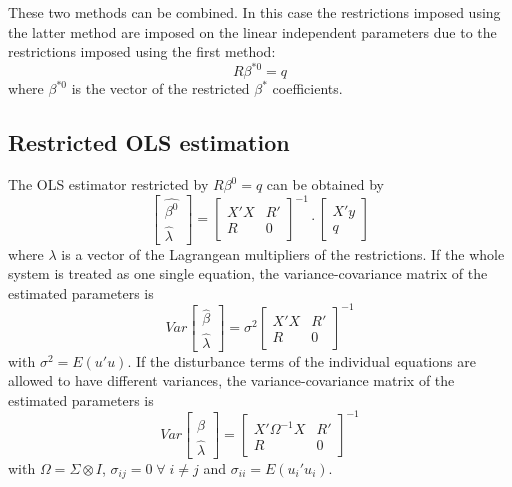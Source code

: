 These two methods can be combined.
In this case the restrictions imposed using the latter method are
imposed on the linear independent parameters due to the restrictions
imposed using the first method:
\begin{equation}
   R \beta^{*0} = q
\end{equation}
where $\beta^{*0}$ is the vector of the restricted $\beta^*$ coefficients.

\subsection{Restricted OLS estimation}
\label{sec:olsR}

The OLS estimator restricted by $R \beta^0 = q$ can be obtained by
\begin{equation}
   \left[ \begin{array}{c}
      \widehat{\beta^0} \\ \widehat{\lambda}
   \end{array} \right]
   =
   \left[ \begin{array}{cc}
      X' X & R' \\ 
      R & 0
   \end{array} \right]^{-1}
   \cdot
   \left[ \begin{array}{c}
      X' y \\ q 
   \end{array} \right]
\end{equation}
where $\lambda$ is a vector of the Lagrangean multipliers of the restrictions.
If the whole system is treated as one single equation,
the variance-covariance matrix of the estimated parameters is
\begin{equation}
   Var 
   \left[ \begin{array}{c}
      \widehat{\beta} \\ \widehat{\lambda}
   \end{array} \right] 
   = \sigma^2 
   \left[ \begin{array}{cc}
      X' X & R' \\ 
      R & 0
   \end{array} \right]^{-1}
\end{equation}
with $\sigma^2 = E \left( u' u \right)$.
If the disturbance terms of the individual equations
are allowed to have different variances, 
the variance-covariance matrix of the estimated parameters is
\begin{equation}
   Var 
   \left[ \begin{array}{c}
      \widehat{\beta} \\ \widehat{\lambda}
   \end{array} \right] 
   = 
   \left[ \begin{array}{cc}
      X' \Omega^{-1} X & R' \\ 
      R & 0
   \end{array} \right]^{-1}
\end{equation}
with $\Omega = \Sigma \otimes I$, 
$\sigma_{ij} = 0 \; \forall \; i \neq j$ and
$\sigma_{ii} = E \left( u_i' u_i \right)$.

